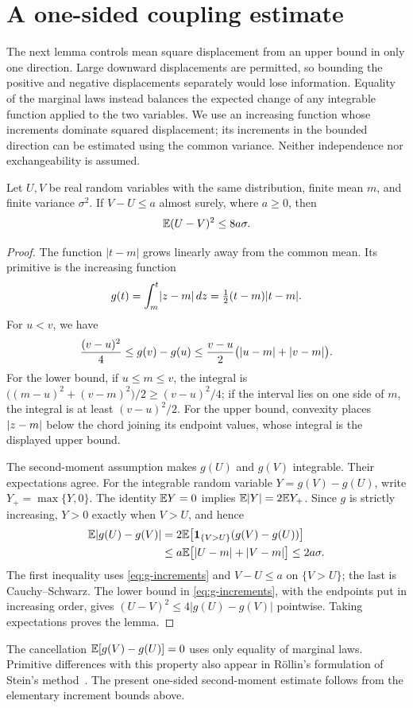 \section{A one-sided coupling estimate}\label{sec:coupling}

The next lemma controls mean square displacement from an upper bound in
only one direction. Large downward displacements are permitted, so
bounding the positive and negative displacements separately would lose
information. Equality of the marginal laws instead balances the expected
change of any integrable function applied to the two variables. We use
an increasing function whose increments dominate squared displacement;
its increments in the bounded direction can be estimated using the common
variance. Neither independence nor exchangeability is assumed.

\begin{lemma}\label{lem:coupling}
Let $U,V$ be real random variables with the same distribution, finite mean
$m$, and finite variance $\sigma^2$. If $V-U\le a$ almost surely, where
$a\ge0$, then
\[
 \mathbb E(U-V)^2\le 8a\sigma.
\]
\end{lemma}

\begin{proof}
The function $|t-m|$ grows linearly away from the common mean. Its
primitive is the increasing function
\[
 g(t)=\int_m^t\lvert z-m\rvert\,dz=\tfrac12(t-m)\lvert t-m\rvert.
\]
For $u<v$, we have
\begin{equation}\label{eq:g-increments}
 \frac{(v-u)^2}{4}\le g(v)-g(u)
 \le \frac{v-u}{2}\bigl(\lvert u-m\rvert+\lvert v-m\rvert\bigr).
\end{equation}
For the lower bound, if $u\le m\le v$, the integral is
$\bigl((m-u)^2+(v-m)^2\bigr)/2\ge(v-u)^2/4$; if the interval lies on one
side of $m$, the integral is at least $(v-u)^2/2$.
For the upper bound, convexity places $\lvert z-m\rvert$ below the chord joining
its endpoint values, whose integral is the displayed upper bound.

The second-moment assumption makes $g(U)$ and $g(V)$ integrable.
Their expectations agree. For the integrable random variable
$Y=g(V)-g(U)$, write $Y_+=\max\{Y,0\}$. The identity $\mathbb E Y=0$ implies
$\mathbb E|Y|=2\mathbb E Y_+$. Since $g$ is strictly increasing, $Y>0$ exactly when
$V>U$, and hence
\begin{align*}
 \mathbb E\lvert g(U)-g(V)\rvert
 &=2\mathbb E\bigl[\mathbf1_{\{V>U\}}(g(V)-g(U))\bigr]\\
 &\le a\mathbb E\bigl[\lvert U-m\rvert+\lvert V-m\rvert\bigr]
 \le 2a\sigma.
\end{align*}
The first inequality uses \eqref{eq:g-increments} and $V-U\le a$ on
$\{V>U\}$; the last is Cauchy--Schwarz.
The lower bound in \eqref{eq:g-increments}, with the endpoints put in
increasing order, gives $(U-V)^2\le4|g(U)-g(V)|$ pointwise. Taking
expectations proves the lemma.
\end{proof}


The cancellation $\mathbb E[g(V)-g(U)]=0$ uses only equality of marginal laws.
Primitive differences with this property also appear in R\"ollin's
formulation of Stein's method~\cite[Section~1]{Rollin2008}.
The present one-sided second-moment estimate follows from the elementary
increment bounds above.
